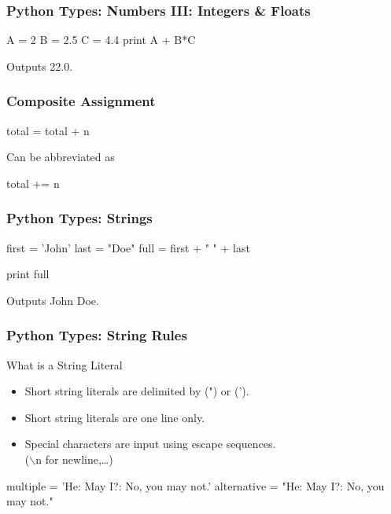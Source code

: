 \begin{frame}[fragile]
\frametitle{Python Types: Numbers III: Integers \& Floats}
\begin{python}
A = 2
B = 2.5
C = 4.4
print A + B*C
\end{python}

Outputs \alert{22.0}.
\end{frame}

\begin{frame}[fragile]
\frametitle{Composite Assignment}

\begin{python}
total = total + n
\end{python}

Can be abbreviated as

\begin{python}
total += n
\end{python}

\end{frame}

\begin{frame}[fragile]
\frametitle{Python Types: Strings}

\begin{python}
first = 'John'
last = "Doe"
full = first + " " + last

print full
\end{python}

\pause
Outputs \alert{John Doe}.
\end{frame}

\begin{frame}[fragile]
\frametitle{Python Types: String Rules}

\begin{block}{What is a String Literal}
\begin{itemize}
\item Short string literals are delimited by (") or (').
\item Short string literals are one line only.
\item Special characters are input using escape sequences.\\
        ($\backslash$n for newline,\ldots)
\end{itemize}
\end{block}

\begin{python}
multiple = 'He: May I?\nShe: No, you may not.'
alternative = "He: May I?\nShe: No, you may not."
\end{python}
\end{frame}

